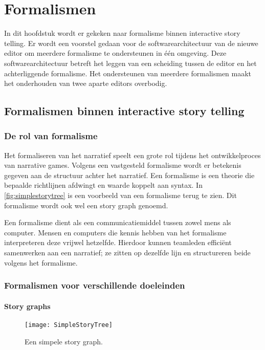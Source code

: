 \chapter{Formalismen}
\label{ch:formalism}
In dit hoofdstuk wordt er gekeken naar formalisme binnen interactive story telling. Er wordt een voorstel gedaan voor de softwarearchitectuur van de nieuwe editor om meerdere formalisme te ondersteunen in één omgeving. Deze softwarearchitectuur betreft het leggen van een scheiding tussen de editor en het achterliggende formalisme. Het ondersteunen van meerdere formalismen maakt het onderhouden van twee aparte editors overbodig.

\section{Formalismen binnen interactive story telling}
\subsection{De rol van formalisme}
Het formaliseren van het narratief speelt een grote rol tijdens het ontwikkelproces van narrative games. Volgens een vastgesteld formalisme wordt er betekenis gegeven aan de structuur achter het narratief. Een formalisme is een theorie die bepaalde richtlijnen afdwingt en waarde koppelt aan syntax. In \autoref{fig:simplestorytree} is een voorbeeld van een formalisme terug te zien. Dit formalisme wordt ook wel een story graph genoemd.

Een formalisme dient als een communicatiemiddel tussen zowel mens als computer. Mensen en computers die kennis hebben van het formalisme interpreteren deze vrijwel hetzelfde. Hierdoor kunnen teamleden efficiënt samenwerken aan een narratief; ze zitten op dezelfde lijn en structureren beide volgens het formalisme.

\subsection{Formalismen voor verschillende doeleinden}
\subsubsection{Story graphs}

\begin{wrapfigure}{r}{0.4\textwidth}
    \centering
    \texttt{[image: SimpleStoryTree]}
    \caption[]{Een simpele story graph. \footnotemark}
    \label{fig:simplestorytree}
\end{wrapfigure}



